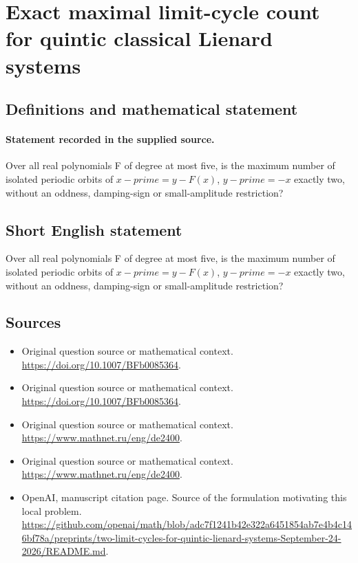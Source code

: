 \documentclass[11pt]{article}
\begin{document}
\section*{Exact maximal limit-cycle count for quintic classical Lienard systems}\label{30007171}
\subsection{Definitions and mathematical statement}
\paragraph{Statement recorded in the supplied source.}
Over all real polynomials F of degree at most five, is the maximum number of isolated periodic orbits of $x-prime=y-F(x)$, $y-prime=-x$ exactly two, without an oddness, damping-sign or small-amplitude restriction?
\subsection{Short English statement}
Over all real polynomials F of degree at most five, is the maximum number of isolated periodic orbits of $x-prime=y-F(x)$, $y-prime=-x$ exactly two, without an oddness, damping-sign or small-amplitude restriction?
\subsection{Sources}
\begin{itemize}
\item[S1] Original question source or mathematical context.
\url{https://doi.org/10.1007/BFb0085364}.
\item[S2] Original question source or mathematical context.
\url{https://doi.org/10.1007/BFb0085364}.
\item[S3] Original question source or mathematical context.
\url{https://www.mathnet.ru/eng/de2400}.
\item[S4] Original question source or mathematical context.
\url{https://www.mathnet.ru/eng/de2400}.
\item[S5] OpenAI, manuscript citation page. Source of the formulation motivating this local problem.
\url{https://github.com/openai/math/blob/adc7f1241b42e322a6451854ab7e4b4c146bf78a/preprints/two-limit-cycles-for-quintic-lienard-systems-September-24-2026/README.md}.
\end{itemize}
\end{document}
